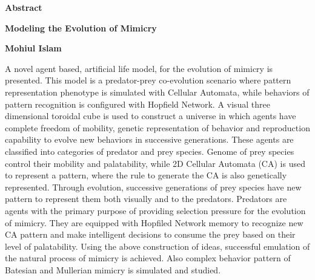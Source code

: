\begin{center}

\begin{Large}
\textbf{Abstract}\\[0.5cm]
\end{Large}

\begin{large}
\textbf{Modeling the Evolution of Mimicry}\\
\end{large}

\begin{small}
\textbf{Mohiul Islam}\\
\end{small}

\end{center}

A novel agent based, artificial life model, for the evolution of mimicry is presented. This model is a predator-prey co-evolution scenario where pattern representation phenotype is simulated with Cellular Automata, while behaviors of pattern recognition is configured with Hopfield Network. A visual three dimensional toroidal cube is used to construct a universe in which agents have complete freedom of mobility, genetic representation of behavior and reproduction capability to evolve new behaviors in successive generations. These agents are classified into categories of predator and prey species. Genome of prey species control their mobility and palatability, while 2D Cellular Automata (CA) is used to represent a pattern, where the rule to generate the CA is also genetically represented. Through evolution, successive generations of prey species have new pattern to represent them both visually and to the predators. Predators are agents with the primary purpose of providing selection pressure for the evolution of mimicry. They are equipped with Hopfiled Network memory to recognize new CA pattern and make intelligent decisions to consume the prey based on their level of palatability. Using the above construction of ideas, successful emulation of the natural process of mimicry is achieved. Also complex behavior pattern of Batesian and Mullerian mimicry is simulated and studied.

\setcounter{page}{3}
